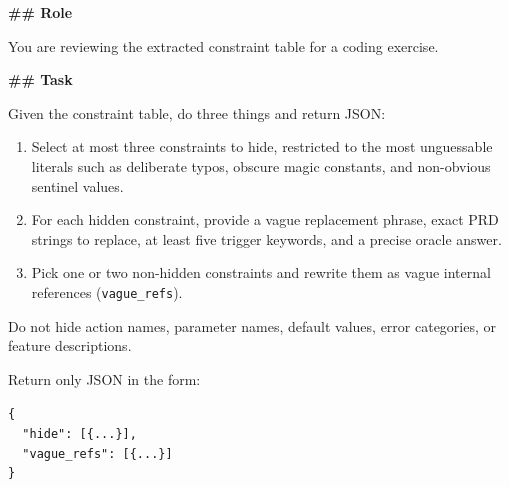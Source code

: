 \begin{promptbox}
\textbf{\#\# Role}

You are reviewing the extracted constraint table for a coding exercise.

\textbf{\#\# Task}

Given the constraint table, do three things and return JSON:
\begin{enumerate}
\item Select at most three constraints to hide, restricted to the most unguessable literals such as deliberate typos, obscure magic constants, and non-obvious sentinel values.
\item For each hidden constraint, provide a vague replacement phrase, exact PRD strings to replace, at least five trigger keywords, and a precise oracle answer.
\item Pick one or two non-hidden constraints and rewrite them as vague internal references (\texttt{vague\_refs}).
\end{enumerate}

Do not hide action names, parameter names, default values, error categories, or feature descriptions.

Return only JSON in the form:

\texttt{\{}\\
\texttt{~~"hide": [\{...\}],}\\
\texttt{~~"vague\_refs": [\{...\}]}\\
\texttt{\}}
\end{promptbox}
